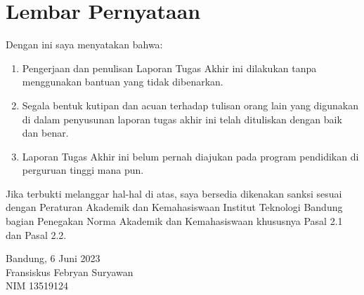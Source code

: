 \chapter*{Lembar Pernyataan}

Dengan ini saya menyatakan bahwa:

\begin{enumerate}

    \item Pengerjaan dan penulisan Laporan Tugas Akhir ini dilakukan tanpa menggunakan bantuan yang tidak dibenarkan.
    \item Segala bentuk kutipan dan acuan terhadap tulisan orang lain yang digunakan di dalam penyusunan laporan tugas akhir ini telah dituliskan dengan baik dan benar.
    \item Laporan Tugas Akhir ini belum pernah diajukan pada program pendidikan di perguruan tinggi mana pun.

\end{enumerate}

Jika terbukti melanggar hal-hal di atas, saya bersedia dikenakan sanksi sesuai dengan Peraturan Akademik dan Kemahasiswaan Institut Teknologi Bandung bagian Penegakan Norma Akademik dan Kemahasiswaan khususnya Pasal 2.1 dan Pasal 2.2.
\vspace{15mm}

Bandung, 6 Juni 2023 \\
Fransiskus Febryan Suryawan \\
NIM 13519124
